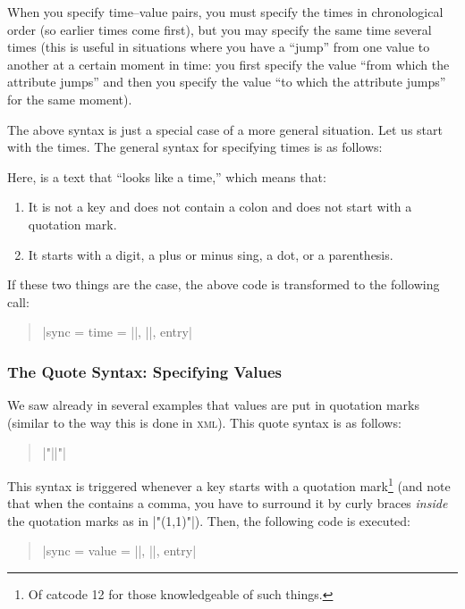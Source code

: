 When you specify time--value pairs, you must specify the times in
chronological order (so earlier times come first), but you may specify
the same time several times (this is useful in situations where you
have a ``jump'' from one value to another at a certain moment in
time: you first specify the value ``from which the attribute jumps''
and then you specify the value ``to which the attribute jumps'' for
the same moment).  

The above syntax is just a special case of a more general
situation. Let us start with the times. The general syntax for
specifying times is as follows:

\begin{quote}
  \normalfont
   
\end{quote}

Here,  is a text that ``looks like a time,'' which means
that:
\begin{enumerate}
\item It is not a key and does not contain a colon and does not start
  with a quotation mark.
\item It starts with a digit, a plus or minus sing, a dot, or a
  parenthesis. 
\end{enumerate}

If these two things are the case, the above code is transformed to the
following call:
\begin{quote}
  \normalfont
  |sync = {time = ||, ||, entry}|
\end{quote}


\subsubsection{The Quote Syntax: Specifying Values}

We saw already in several examples that values are put in quotation
marks (similar to the way this is done in \textsc{xml}). This quote
syntax is as follows: 

\begin{quote}
  \normalfont
  |"||"|  
\end{quote}

This syntax is triggered whenever a key starts with a quotation
mark\footnote{Of catcode 12 for those knowledgeable of such
  things.} (and note that when the  contains a comma, you have to surround
it by curly braces \emph{inside} the quotation marks as in
|"{(1,1)}"|). Then, the following code is executed:
\begin{quote}
  \normalfont
  |sync = {value = ||, ||, entry}|
\end{quote}

